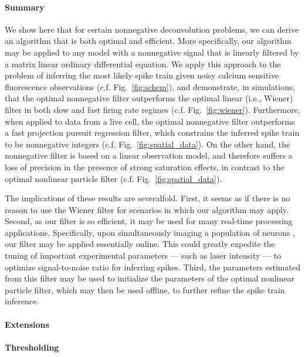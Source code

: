 \paragraph{Summary}

We show here that for certain nonnegative deconvolution problems, we can derive an algorithm that is both optimal and efficient.  More specifically, our algorithm may be applied to any model with a nonnegative signal that is linearly filtered by a matrix linear ordinary differential equation.  We apply this approach to the problem of inferring the most likely spike train given noisy calcium sensitive fluorescence observations (c.f. Fig.\ \ref{fig:schem}), and demonstrate, in simulations, that the optimal nonnegative filter outperforms the optimal linear (i.e., Wiener) filter in both slow and fast firing rate regimes (c.f. Fig.\ \ref{fig:wiener}).  Furthermore, when applied to data from a live cell, the optimal nonnegative filter outperforms a fast projection pursuit regression filter, which constrains the inferred spike train to be nonnegative integers (c.f. Fig.\ \ref{fig:spatial_data}). On the other hand, the nonnegative filter is based on a linear observation model, and therefore suffers a loss of precision in the presence of strong saturation effects, in contrast to the optimal nonlinear particle filter (c.f. Fig.\ \ref{fig:spatial_data}).    

The implications of these results are severalfold.  First, it seems as if there is no reason to use the Wiener filter for scenarios in which our algorithm may apply.  Second, as our filter is so efficient, it may be used for many real-time processing applications.  Specifically, upon simultaneously imaging a population of neurons \cite{IkegayaYuste04, NiellSmith05, OhkiReid05, YaksiFriedrich06, SatoSvoboda07}, our filter may be applied essentially online.  This could greatly expedite the tuning of important experimental parameters --- such as laser intensity --- to optimize signal-to-noise ratio for inferring spikes.  Third, the parameters estimated from this filter may be used to initialize the parameters of the optimal nonlinear particle filter, which may then be used offline, to further refine the spike train inference. %

\paragraph{Extensions}

\paragraph{Thresholding}

